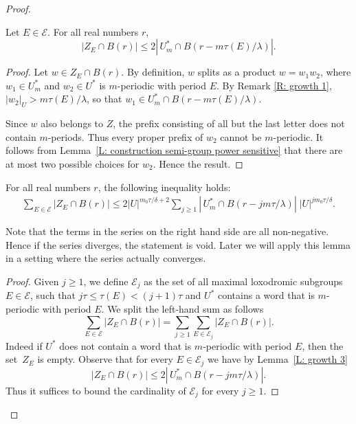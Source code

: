 \begin{proof}
\begin{lem}\label{L: growth 3} Let $E\in \mathcal{E}$.
For all real numbers $r$,
\begin{equation*}
|Z_E\cap B(r)| \leqslant 2 |\, U^*_m \cap B\left(r-m \tau(E)/\lambda\right)|.
\end{equation*}
\end{lem}
\begin{proof}
Let $w\in Z_E\cap B(r)$. By definition, $w$ splits as a product $w=w_1w_2$, where $w_1 \in U^*_m$ and $w_2\in U^*$ is $m$-periodic with period $E$.
By Remark \ref{R: growth 1}, $|w_2|_U> m \tau(E)/\lambda$, so that $w_1 \in U^*_m \cap B(r-m \tau(E)/\lambda)$.

Since $w$ also belongs to $Z$, the prefix consisting of all but the last letter does not contain $m$-periods.
Thus every proper prefix of $w_2$ cannot be $m$-periodic.
It follows from Lemma~\ref{L: construction semi-group power sensitive} that there are at most two possible choices for $w_2$.
Hence the result.
\end{proof}

\begin{lem}\label{I: growth 3} For all real numbers $r$, the following inequality holds:
\begin{align*}
\sum_{E\in \mathcal{E}} |Z_E\cap B(r)| \leqslant
2|U|^{m_0\tau/\delta +2}
\sum_{j\geqslant 1} |\, U^*_m \cap B\left(r -jm\tau/\lambda\right)|\; |U|^{ jm_0\tau/\delta}.
\end{align*}
\end{lem}

\begin{rem}
Note that the terms in the series on the right hand side are all non-negative.
Hence if the series diverges, the statement is void.
Later we will apply this lemma in a setting where the series actually converges.
\end{rem}

\begin{proof}
Given $j \geq 1$, we define $\mathcal E_j$ as the set of all maximal loxodromic subgroups $E \in \mathcal E$, such that $j\tau \leq \tau(E) < (j+1)\tau$ and $U^*$ contains a word that is $m$-periodic with period $E$.
We split the left-hand sum as follows
\begin{equation*}
\sum_{E\in \mathcal{E}} |Z_E\cap B(r)|
= \sum_{j \geq 1} \sum_{E\in \mathcal{E}_j} |Z_E\cap B(r)|.
\end{equation*}
Indeed if $U^*$ does not contain a word that is $m$-periodic with period $E$, then the set~$Z_E$ is empty.
Observe that for every $E \in \mathcal E_j$ we have by Lemma~\ref{L: growth 3}
\begin{equation*}
|Z_E\cap B(r)| \leqslant 2 |\, U^*_m \cap B\left(r -jm\tau/\lambda\right)|.
\end{equation*}
Thus it suffices to bound the cardinality of $\mathcal E_j$ for every $j \geq 1$.


\end{proof}
\end{proof}
